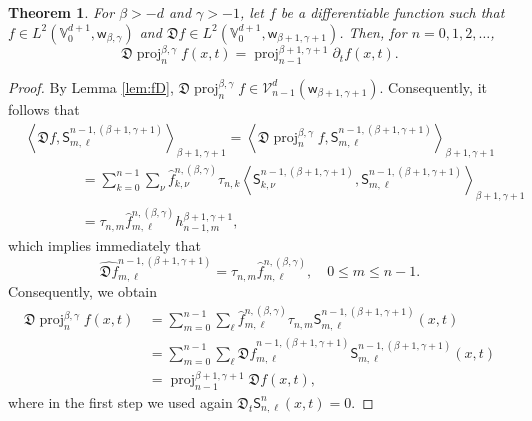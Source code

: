 \documentclass{amsart}
\newtheorem{thm}{Theorem}[section]
\theoremstyle{remark}
\def\sw{{\mathsf w}}
\def\sS{{\mathsf S}}
\def\fD{{\mathfrak D}}
\def\b{{\beta}}
\def\g{{\gamma}}
\def\CV{{\mathcal V}}
\def\VV{{\mathbb V}}
\def\proj{\operatorname{proj}}
\newcommand{\wh}{\widehat}
\begin{document}
\begin{thm} \label{thm:partialP}
For $\b > -d$ and $\g > -1$, let $f$ be a differentiable function such that $f\in L^2(\VV_0^{d+1}, \sw_{\b,\g})$
and $\fD f \in  L^2(\VV_0^{d+1}, \sw_{\b+1,\g+1})$. Then, for $n =0,1,2,\ldots$,
$$
   \fD \proj_n^{\b,\g} f(x,t) = \proj_{n-1}^{\b+1,\g+1} \partial_t f (x,t).
$$
\end{thm}

\begin{proof}
By Lemma \ref{lem:fD}, $\fD \proj_n^{\b,\g} f \in \CV_{n-1}^d(\sw_{\b+1,\g+1})$. Consequently, it follows that
\begin{align*}
& \left \langle  \fD f, \sS_{m,\ell}^{n-1,(\b+1,\g+1)}\right \rangle_{\b+1,\g+1}  =
  \left \langle \fD \proj_n^{\b,\g} f,  \sS_{m,\ell}^{n-1,(\b+1,\g+1)} \right \rangle_{\b+1,\g+1}  \\
  & \qquad\qquad = \sum_{k=0}^{n-1} \sum_{\nu} \hat f_{k,\nu}^{n,(\b,\g)}  \tau_{n,k}  \left \langle\sS_{k,\nu}^{n-1,(\b+1,\g+1)},
        \sS_{m,\ell}^{n-1,(\b+1,\g+1)} \right \rangle_{\b+1,\g+1}  \\
  &  \qquad\qquad = \tau_{n,m}  \hat f_{m,\ell}^{n,(\b,\g)} h_{n-1,m}^{\b+1,\g+1},
\end{align*}
which implies immediately that
$$
    \wh{\fD f}_{m,\ell}^{n-1, (\b+1,\g+1)} = \tau_{n,m} \hat f_{m,\ell}^{n,(\b,\g)}, \quad 0 \le m \le n-1.
$$
Consequently, we obtain
\begin{align*}
  \fD \proj_n^{\b,\g} f (x,t)
      \, & = \sum_{m=0}^{n-1} \sum_\ell \hat f_{m,\ell}^{n,(\b,\g)}\tau_{n,m} \sS_{m,\ell}^{n-1,(\b+1,\g+1)}(x,t) \\
       & = \sum_{m=0}^{n-1} \sum_\ell \wh{\fD f}_{m,\ell}^{n-1, (\b+1,\g+1)} \sS_{m,\ell}^{n-1,(\b+1,\g+1)}(x,t) \\
       & = \proj_{n-1}^{\b+1,\g+1} \fD f (x,t),
\end{align*}
where in the first step we used again $\fD_t \sS_{n,\ell}^n(x,t) = 0$.
\end{proof}
\end{document}
